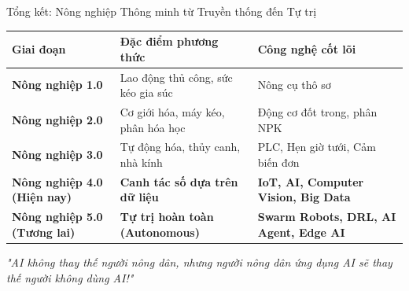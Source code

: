 \documentclass[aspectratio=169,10pt]{beamer}
\begin{document}
\begin{frame}{Tổng kết: Nông nghiệp Thông minh từ Truyền thống đến Tự trị}
    \begin{table}[h]
        \centering
        \footnotesize
        \begin{tabular}{p{3.2cm} p{4.5cm} p{5.5cm}}
            \toprule
            \textbf{Giai đoạn} & \textbf{Đặc điểm phương thức} & \textbf{Công nghệ cốt lõi} \\
            \midrule
            \textbf{Nông nghiệp 1.0} & Lao động thủ công, sức kéo gia súc & Nông cụ thô sơ \\
            \textbf{Nông nghiệp 2.0} & Cơ giới hóa, máy kéo, phân hóa học & Động cơ đốt trong, phân NPK \\
            \textbf{Nông nghiệp 3.0} & Tự động hóa, thủy canh, nhà kính & PLC, Hẹn giờ tưới, Cảm biến đơn \\
            \rowcolor{AgriPrimary!15}
            \textbf{Nông nghiệp 4.0 (Hiện nay)} & \textbf{Canh tác số dựa trên dữ liệu} & \textbf{IoT, AI, Computer Vision, Big Data} \\
            \rowcolor{AgriAccent!20}
            \textbf{Nông nghiệp 5.0 (Tương lai)} & \textbf{Tự trị hoàn toàn (Autonomous)} & \textbf{Swarm Robots, DRL, AI Agent, Edge AI} \\
            \bottomrule
        \end{tabular}
    \end{table}
    \vspace{0.2cm}
    \begin{center}
        \textit{"AI không thay thế người nông dân, nhưng người nông dân ứng dụng AI sẽ thay thế người không dùng AI!"}
    \end{center}
\end{frame}
\end{document}
